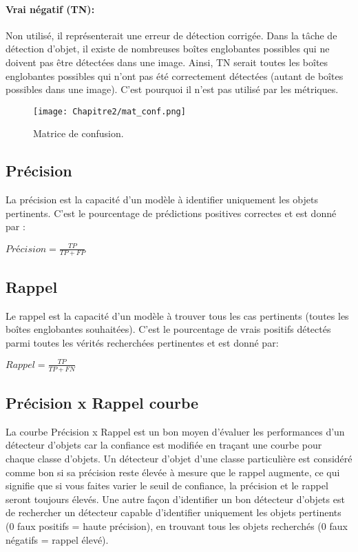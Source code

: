           \paragraph{Vrai négatif (TN):} Non utilisé, il représenterait une erreur de détection corrigée. Dans la tâche de détection d'objet, il existe de nombreuses boîtes englobantes possibles qui ne doivent pas être détectées dans une image. Ainsi, TN serait toutes les boîtes englobantes possibles qui n'ont pas été correctement détectées (autant de boîtes possibles dans une image). C'est pourquoi il n'est pas utilisé par les métriques.
          \begin{figure}[H]
               \centering
               \texttt{[image: Chapitre2/mat\_conf.png]}
               \caption{Matrice de confusion.}
               \label{mat_conf}
               \end{figure}
          
          \subsection{Précision}
          La précision est la capacité d'un modèle à identifier uniquement les objets pertinents. C'est le pourcentage de prédictions positives correctes et est donné par :
          \begin{center} $Précision = \frac{TP}{TP + FP}$ \end{center}

          \subsection{Rappel}
          Le rappel est la capacité d'un modèle à trouver tous les cas pertinents (toutes les boîtes englobantes souhaitées). C'est le pourcentage de vrais positifs détectés parmi toutes les vérités recherchées pertinentes et est donné par:
          \begin{center} $Rappel = \frac{TP}{TP + FN}$ \end{center}
          
          \subsection{Précision x Rappel courbe}
          La courbe Précision x Rappel est un bon moyen d'évaluer les performances d'un détecteur d'objets car la confiance est modifiée en traçant une courbe pour chaque classe d'objets. Un détecteur d'objet d'une classe particulière est considéré comme bon si sa précision reste élevée à mesure que le rappel augmente, ce qui signifie que si vous faites varier le seuil de confiance, la précision et le rappel seront toujours élevés. Une autre façon d'identifier un bon détecteur d'objets est de rechercher un détecteur capable d'identifier uniquement les objets pertinents (0 faux positifs = haute précision), en trouvant tous les objets recherchés (0 faux négatifs = rappel élevé).
          
